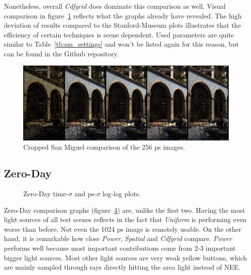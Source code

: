 Nonetheless, overall \textit{Cdfgrid} does dominate this comparison as well. Visual comparison in figure~\ref{fig:migcomp} reflects what the graphs already have revealed. The high deviation of results compared to the Stanford-Museum plots illustrates that the efficiency of certain techniques is scene dependent. Used parameters are quite similar to Table~\ref{tb:sm_settings} and won't be listed again for this reason, but can be found in the Github repository.

\begin{figure}
    \centering
    \includegraphics[width=1\textwidth]{figures/comparisons/Mig_comp_same_slimmer.png}
    \caption{Cropped San Miguel comparison of the 256 ps images.}
    \label{fig:migcomp}
\end{figure}

\FloatBarrier
\subsection{Zero-Day}

\begin{figure}
    \centering
    \begin{subfigure}{.5\textwidth}
      \centering
        \caption{}
        \label{fig:zd_t}
    \end{subfigure}%
    \begin{subfigure}{.5\textwidth}
        \caption{}
        \label{fig:zd_ps}
    \end{subfigure}
    \caption{Zero-Day time-$\sigma$ and ps-$\sigma$ log-log plots.}
    \label{fig:zd}
\end{figure}

Zero-Day comparison graphs (figure~\ref{fig:zd}) are, unlike the first two. Having the most light sources of all test scenes reflects in the fact that \textit{Uniform} is performing even worse than before. Not even the 1024 ps image is remotely usable. On the other hand, it is remarkable how close \textit{Power}, \textit{Spatial} and \textit{Cdfgrid} compare. \textit{Power} performs well because most important contributions come from 2-3 important bigger light sources. Most other light sources are very weak yellow buttons, which are mainly sampled through rays directly hitting the area light instead of NEE.

